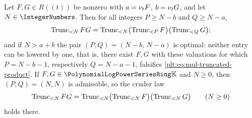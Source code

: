 \begin{corollary}
\label{plt:cor:mul-truncated-product}
Let $F,G\in R((t))$ be nonzero with $a=\ordt F$, $b=\ordt G$, and let
$N\in\IntegerNumbers$.  Then for all integers $P\ge N-b$ and $Q\ge N-a$,
\begin{equation}\label{plt:eq:mul-truncated-product}
 \Trunc{FG}{N}
 =\Trunc{\bigl(\Trunc{F}{P}\bigr)\bigl(\Trunc{G}{Q}\bigr)}{N};
\end{equation}
and if $N>a+b$ the pair $(P,Q)=(N-b,\,N-a)$ is optimal: neither entry can be
lowered by one, that is, there exist $F,G$ with these valuations
for which $P=N-b-1$, respectively $Q=N-a-1$, falsifies
\eqref{plt:eq:mul-truncated-product}.  If $F,G\in\PLpow$ and $N\ge0$, then
$(P,Q)=(N,N)$ is admissible, so the cruder law
\begin{equation}\label{plt:eq:mul-truncated-product-crude}
 \Trunc{FG}{N}=\Trunc{\bigl(\Trunc{F}{N}\bigr)\bigl(\Trunc{G}{N}\bigr)}{N}
 \qquad(N\ge0)
\end{equation}
holds there.
\end{corollary}

